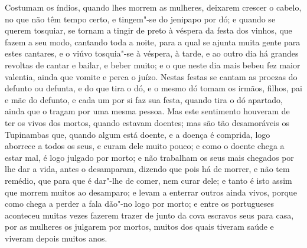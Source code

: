 Costumam os índios, quando lhes morrem as mulheres, deixarem crescer o cabelo, no que não
têm tempo certo, e tingem"-se do jenipapo por dó; e quando se querem tosquiar, se tornam a
tingir de preto à véspera da festa dos vinhos, que fazem a seu modo, cantando toda a
noite, para a qual se ajunta muita gente para estes cantares, e o viúvo tosquia"-se à
véspera, à tarde, e ao outro dia há grandes revoltas de cantar e bailar, e beber muito; e
o que neste dia mais bebeu fez maior valentia, ainda que vomite e perca o juízo. Nestas
festas se cantam as proezas do defunto ou defunta, e do que tira o dó, e o mesmo dó tomam
os irmãos, filhos, pai e mãe do defunto, e cada um por si faz sua festa, quando tira o dó
apartado, ainda que o tragam por uma mesma pessoa. Mas este sentimento houveram de ter os
vivos dos mortos, quando estavam doentes; mas são tão desamoráveis os Tupinambas que,
quando algum está doente, e a doença é comprida, logo aborrece a todos os seus, e curam
dele muito pouco; e como o doente chega a estar mal, é logo julgado por morto; e não
trabalham os seus mais chegados por lhe dar a vida, antes o desamparam, dizendo que pois
há de morrer, e não tem remédio, que para que é dar"-lhe de comer, nem curar dele; e tanto
é isto assim que morrem muitos ao desamparo; e levam a enterrar outros ainda vivos, porque
como chega a perder a fala dão"-no logo por morto; e entre os portugueses aconteceu muitas
vezes fazerem trazer de junto da cova escravos seus para casa, por as mulheres os julgarem
por mortos, muitos dos quais tiveram saúde e viveram depois muitos anos.

